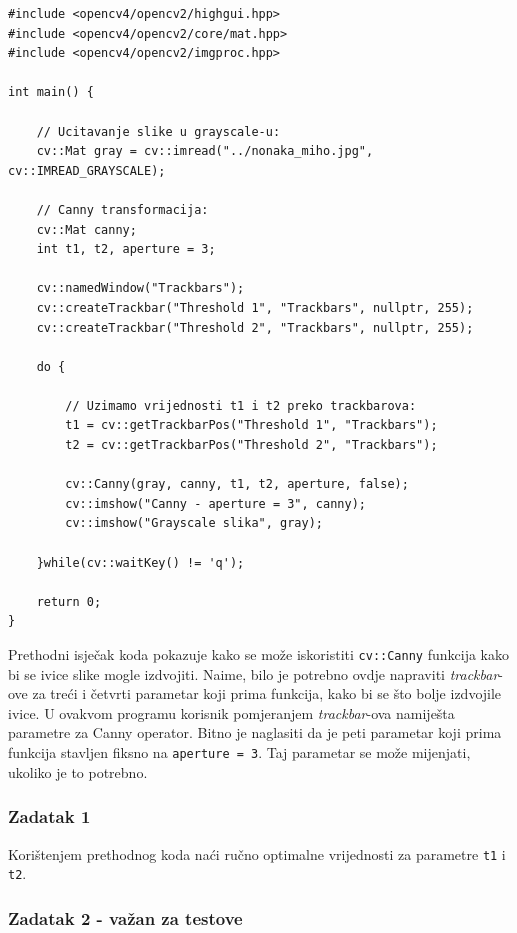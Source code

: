 \documentclass[a4paper, 12pt]{article}
\begin{document}
\begin{lstlisting}
#include <opencv4/opencv2/highgui.hpp>
#include <opencv4/opencv2/core/mat.hpp>
#include <opencv4/opencv2/imgproc.hpp>

int main() {

    // Ucitavanje slike u grayscale-u:
    cv::Mat gray = cv::imread("../nonaka_miho.jpg", cv::IMREAD_GRAYSCALE);

    // Canny transformacija:
    cv::Mat canny;
    int t1, t2, aperture = 3;

    cv::namedWindow("Trackbars");
    cv::createTrackbar("Threshold 1", "Trackbars", nullptr, 255);
    cv::createTrackbar("Threshold 2", "Trackbars", nullptr, 255);

    do {

        // Uzimamo vrijednosti t1 i t2 preko trackbarova:
        t1 = cv::getTrackbarPos("Threshold 1", "Trackbars");
        t2 = cv::getTrackbarPos("Threshold 2", "Trackbars");

        cv::Canny(gray, canny, t1, t2, aperture, false);
        cv::imshow("Canny - aperture = 3", canny);
        cv::imshow("Grayscale slika", gray);

    }while(cv::waitKey() != 'q');

    return 0;
}
\end{lstlisting}

Prethodni isječak koda pokazuje kako se može iskoristiti \lstinline{cv::Canny} funkcija kako bi se ivice slike mogle izdvojiti. Naime, bilo je potrebno ovdje napraviti \textit{trackbar}-ove za treći i četvrti parametar koji prima funkcija, kako bi se što bolje izdvojile ivice. U ovakvom programu korisnik pomjeranjem \textit{trackbar}-ova namiješta parametre za Canny operator. Bitno je naglasiti da je peti parametar koji prima funkcija stavljen fiksno na \lstinline{aperture = 3}. Taj parametar se može mijenjati, ukoliko je to potrebno. 

\subsubsection*{Zadatak 1}

Korištenjem prethodnog koda naći ručno optimalne vrijednosti za parametre \lstinline{t1} i \lstinline{t2}.

\subsubsection*{Zadatak 2 - važan za testove}
\end{document}
